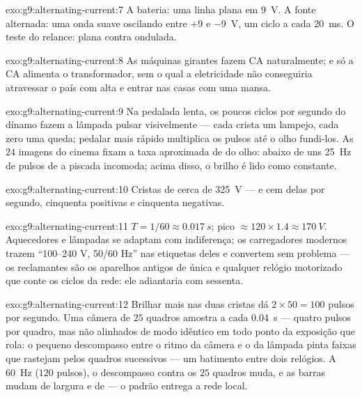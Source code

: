 \begin{solution}{exo:g9:alternating-current:7}
A bateria: uma linha plana em \qty{9}{V}. A fonte alternada: uma onda
suave oscilando entre $+9$ e \qty{-9}{V}, um ciclo a cada
\qty{20}{ms}. O teste do relance: plana contra ondulada.
\end{solution}

\begin{solution}{exo:g9:alternating-current:8}
As máquinas girantes fazem CA naturalmente; e só a CA alimenta o
transformador, sem o qual a eletricidade não conseguiria atravessar o
país com  alta e entrar nas casas com uma  mansa.
\end{solution}

\begin{solution}{exo:g9:alternating-current:9}
Na pedalada lenta, os poucos ciclos por segundo do dínamo fazem a
lâmpada pulsar visivelmente --- cada crista um lampejo, cada zero uma
queda; pedalar mais rápido multiplica os pulsos até o olho fundi-los.
As $24$ imagens do cinema fixam a taxa aproximada de  do olho:
abaixo de uns \qty{25}{Hz} de pulsos de  a piscada incomoda; acima
disso, o brilho é lido como constante.
\end{solution}

\begin{solution}{exo:g9:alternating-current:10}
Cristas de cerca de \qty{325}{V} --- e cem delas por segundo,
cinquenta positivas e cinquenta negativas.
\end{solution}

\begin{solution}{exo:g9:alternating-current:11}
$T = 1/60 \approx \qty{0.017}{s}$; pico
$\approx 120 \times 1.4 \approx \qty{170}{V}$. Aquecedores e lâmpadas
se adaptam com indiferença; os carregadores modernos trazem
``100--240 V, 50/60 Hz'' nas etiquetas deles e convertem sem
problema --- os reclamantes são os aparelhos antigos de  única
e qualquer relógio motorizado que conte os ciclos da rede: ele
adiantaria com sessenta.
\end{solution}

\begin{solution}{exo:g9:alternating-current:12}
Brilhar mais nas duas cristas dá $2 \times 50 = 100$ pulsos por
segundo. Uma câmera de $25$ quadros amostra a cada \qty{0.04}{s} ---
quatro pulsos por quadro, mas não alinhados de modo idêntico em todo
ponto da exposição que rola: o pequeno descompasso entre o ritmo da
câmera e o da lâmpada pinta faixas que rastejam pelos quadros
sucessivos --- um batimento entre dois relógios. A \qty{60}{Hz}
($120$ pulsos), o descompasso contra os $25$ quadros muda, e as
barras mudam de largura e de  --- o padrão entrega a rede
local.
\end{solution}


